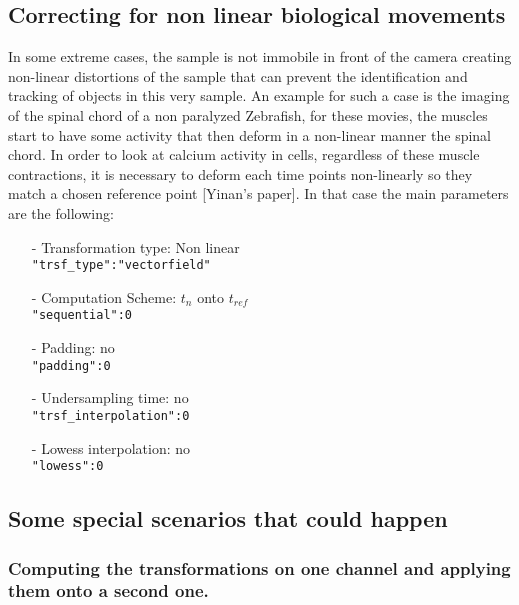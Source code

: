 \documentclass[10pt,a4paper]{book}
\begin{document}
\subsection{Correcting for non linear biological movements}
In some extreme cases, the sample is not immobile in front of the camera creating non-linear distortions of the sample that can prevent the identification and tracking of objects in this very sample. An example for such a case is the imaging of the spinal chord of a non paralyzed Zebrafish, for these movies, the muscles start to have some activity that then deform in a non-linear manner the spinal chord. In order to look at calcium activity in cells, regardless of these muscle contractions, it is necessary to deform each time points non-linearly so they match a chosen reference point [Yinan's paper]. In that case the main parameters are the following:
	\begin{itemize}
		\item[-] Transformation type: Non linear\\
					\texttt{"trsf\_type":"vectorfield"}
		\item[-] Computation Scheme: $t_n$ onto $t_{ref}$\\
					\texttt{"sequential":0}
		\item[-] Padding: no\\
					\texttt{"padding":0}
		\item[-] Undersampling time: no\\
					\texttt{"trsf\_interpolation":0}
		\item[-] Lowess interpolation: no\\
					\texttt{"lowess":0}
	\end{itemize}
\subsection{Some special scenarios that could happen}
\subsubsection{Computing the transformations on one channel and applying them onto a second one.}
\end{document}
